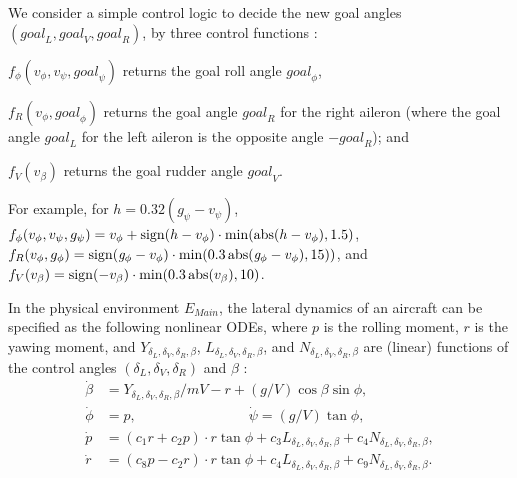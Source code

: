 We consider a simple control logic to decide 
the new goal angles $(\mathit{goal}_L,\mathit{goal}_V,\mathit{goal}_R)$,
by three control functions \cite{ftscs-journal}:
%
\begin{inparaenum}[(i)]
	\item $f_\phi(v_\phi, v_\psi, \mathit{goal}_\psi)$
		returns the goal roll angle $\mathit{goal}_\phi$,
	\item $f_{R}(v_\phi, \mathit{goal}_\phi)$ returns the goal angle $\mathit{goal}_R$ for the right aileron
	(where the goal angle $\mathit{goal}_L$ for the left aileron is the opposite angle $- \mathit{goal}_R$);
	and
	\item $f_V(v_\beta)$ returns the goal rudder angle $\mathit{goal}_V$.
\end{inparaenum}
For example,
for $h = 0.32  (\mathit{g}_\psi - v_\psi)$,
$f_\phi(v_\phi, v_\psi, g_\psi) = 
v_\phi + \mathrm{sign}(h - v_\phi) \cdot \min(\mathrm{abs}(h - v_\phi),1.5)$,
$f_{R}(v_\phi, g_\phi) =
\mathrm{sign}(\mathit{g}_\phi - v_\phi)\cdot \min(0.3 \,\mathrm{abs}(\mathit{g}_\phi - v_\phi), 15))$,
and
$f_V(v_\beta) =
\mathrm{sign}(-v_\beta)\cdot \min(0.3  \,\mathrm{abs}(v_\beta), 10)$.

In the physical environment $E_\mathit{Main}$,
the lateral dynamics of an aircraft
can be specified as the following nonlinear ODEs,
where $p$ is the rolling moment, $r$ is the yawing moment,
and $Y_{\delta_L,\delta_V,\delta_R,\beta}$, $L_{\delta_L,\delta_V,\delta_R,\beta}$, and $N_{\delta_L,\delta_V,\delta_R,\beta}$
are (linear) functions of the control angles $(\delta_L,\delta_V,\delta_R)$ 
and $\beta$
\cite{stevens2003aircraft}:
%
\begin{align*}
\dot{\beta} &= Y_{\delta_L,\delta_V,\delta_R,\beta} / m V - r + (g / V) \cos \beta \sin \phi,
\\
\dot{\phi} &= p,
\qquad\qquad\qquad\qquad
\dot{\psi} = (g / V) \tan \phi,
\\
\dot{p} &= (c_1 r + c_2 p) \cdot r  \tan \phi + c_3 L_{\delta_L,\delta_V,\delta_R,\beta} + c_4 N_{\delta_L,\delta_V,\delta_R,\beta},
\\
\dot{r} &= (c_8 p - c_2 r)  \cdot r  \tan \phi + c_4 L_{\delta_L,\delta_V,\delta_R,\beta} + c_9 N_{\delta_L,\delta_V,\delta_R,\beta}.
\end{align*}
%



